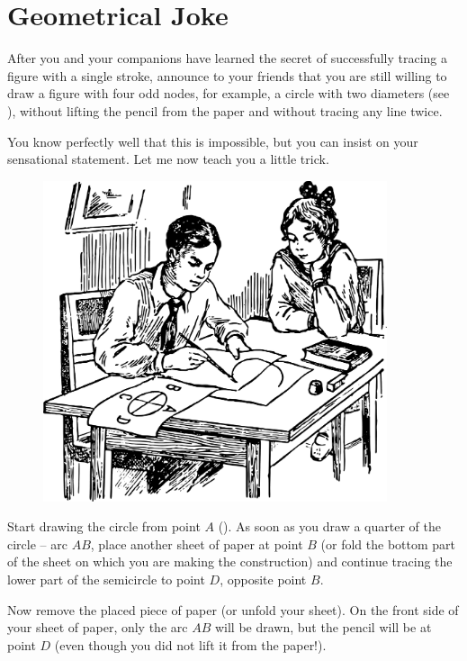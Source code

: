 \section{Geometrical Joke}
\label{sec-10.11}

After you and your companions have learned the secret of successfully tracing a figure with a single stroke, announce to your friends that you are still willing to draw a figure with four odd nodes, for example, a circle with two diameters (see ), without lifting the pencil from the paper and without tracing any line twice.

You know perfectly well that this is impossible, but you can insist on your sensational statement. Let me now teach you a little trick.

\begin{figure}[h!]
\centering
\includegraphics[width=0.9\textwidth]{figures/ch-10/fig-158.pdf}
\end{figure}



Start drawing the circle from point $A$ (). As soon as you draw a quarter of the circle -- arc $AB$, place another sheet of paper at point $B$ (or fold the bottom part of the sheet on which you are making the construction) and continue tracing the lower part of the semicircle to point $D$, opposite point $B$.

Now remove the placed piece of paper (or unfold your sheet). On the front side of your sheet of paper, only the arc $AB$ will be drawn, but the pencil will be at point $D$ (even though you did not lift it from the paper!).

